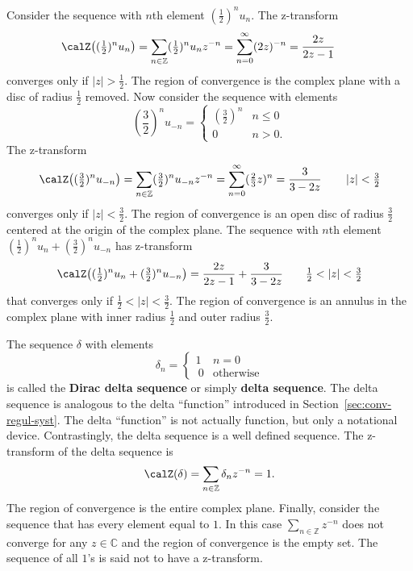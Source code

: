\documentclass[11pt,a4paper]{book}
\theoremstyle{plain}
\numberwithin{equation}{section}
\newcommand{\ints}{{\mathbb Z}}
\newcommand{\complex}{{\mathbb C}}
\newcommand{\term}{\textbf}
\newcommand{\abs}[1]{\left\vert #1 \right\vert}
\begin{document}
Consider the sequence with $n$th element $(\tfrac{1}{2})^{n} u_n$.  The z-transform
\[
\calZ\big( (\tfrac{1}{2})^{n} u_n\big) = \sum_{n \in \ints} (\tfrac{1}{2})^{n} u_n z^{-n} = \sum_{n=0}^\infty (2z)^{-n} = \frac{2z}{2z - 1} \qquad 
\]
converges only if $\abs{z} > \tfrac{1}{2}$.  The region of convergence is the complex plane with a disc of radius $\tfrac{1}{2}$ removed.  Now consider the sequence with elements 
\[
(\frac{3}{2})^{n} u_{-n} =  \begin{cases} 
(\frac{3}{2})^{n} & n \leq 0 \\
0 & n > 0.
\end{cases}
\]
The z-transform
\[
\calZ\big( (\tfrac{3}{2})^n u_{-n} \big) = \sum_{n \in \ints} (\tfrac{3}{2})^{n} u_{-n} z^{-n} = \sum_{n=0}^\infty (\tfrac{2}{3} z)^{n} = \frac{3}{3 - 2z} \qquad \abs{z} < \tfrac{3}{2}
\]
converges only if $\abs{z} < \tfrac{3}{2}$.  The region of convergence is an open disc of radius $\frac{3}{2}$ centered at the origin of the complex plane.  The sequence with $n$th element $(\tfrac{1}{2})^{n} u_n + (\frac{3}{2})^{n} u_{-n}$ has z-transform
\[
\calZ\big((\tfrac{1}{2})^{n} u_n + (\tfrac{3}{2})^{n} u_{-n}\big) =  \frac{2z}{2z - 1} + \frac{3}{3 - 2z} \qquad \tfrac{1}{2} < \abs{z} < \tfrac{3}{2}
\]
that converges only if $\tfrac{1}{2} < \abs{z} < \tfrac{3}{2}$.  The region of convergence is an annulus in the complex plane with inner radius $\tfrac{1}{2}$ and outer radius $\tfrac{3}{2}$.

The sequence $\delta$ with elements
\[
\delta_n = \begin{cases}
1 & n = 0 \\\
0 & \text{otherwise}
\end{cases}
\]  
is called the \term{Dirac delta sequence} or simply \term{delta sequence}.  The delta sequence is analogous to the delta ``function'' introduced in Section~\ref{sec:conv-regul-syst}.  The delta ``function'' is not actually function, but only a notational device.  Contrastingly, the delta sequence is a well defined sequence.  The z-transform of the delta sequence is
\[
\calZ(\delta) = \sum_{n \in \ints} \delta_n z^{-n} = 1.
\]
The region of convergence is the entire complex plane.  Finally, consider the sequence that has every element equal to $1$.  In this case $\sum_{n \in \ints} z^{-n}$ does not converge for any $z \in \complex$ and the region of convergence is the empty set.  The sequence of all $1$'s is said not to have a z-transform.
\end{document}
